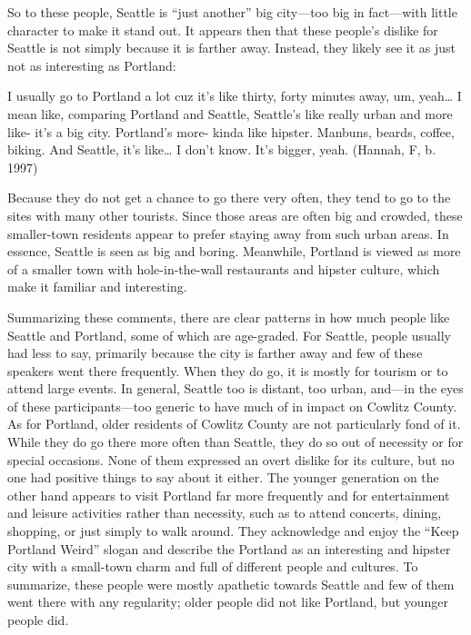 So to these people, Seattle is ``just another'' big city---too big in fact---with little character to make it stand out. It appears then that these people's dislike for Seattle is not simply because it is farther away. Instead, they likely see it as just not as interesting as Portland:
\begin{num_quote}
    I usually go to Portland a lot cuz it's like thirty, forty minutes away, um, yeah… I mean like, comparing Portland and Seattle, Seattle's like really urban and more like- it's a big city. Portland's more- kinda like hipster. Manbuns, beards, coffee, biking. And Seattle, it's like… I don't know. It's bigger, yeah. (Hannah, F, b. 1997)
    \label{quote:seattle_is_far}
\end{num_quote}
Because they do not get a chance to go there very often, they tend to go to the sites with many other tourists. Since those areas are often big and crowded, these smaller-town residents appear to prefer staying away from such urban areas. In essence, Seattle is seen as big and boring. Meanwhile, Portland is viewed as more of a smaller town with hole-in-the-wall restaurants and hipster culture, which make it familiar and interesting.

Summarizing these comments, there are clear patterns in how much people like Seattle and Portland, some of which are age-graded. For Seattle, people usually had less to say, primarily because the city is farther away and few of these speakers went there frequently. When they do go, it is mostly for tourism or to attend large events. In general, Seattle too is distant, too urban, and---in the eyes of these participants---too generic to have much of in impact on Cowlitz County. As for Portland, older residents of Cowlitz County are not particularly fond of it. While they do go there more often than Seattle, they do so out of necessity or for special occasions. None of them expressed an overt dislike for its culture, but no one had positive things to say about it either. The younger generation on the other hand appears to visit Portland far more frequently and for entertainment and leisure activities rather than necessity, such as to attend concerts, dining, shopping, or just simply to walk around. They acknowledge and enjoy the ``Keep Portland Weird'' slogan and describe the Portland as an interesting and hipster city with a small-town charm and full of different people and cultures. To summarize, these people were mostly apathetic towards Seattle and few of them went there with any regularity; older people did not like Portland, but younger people did.

